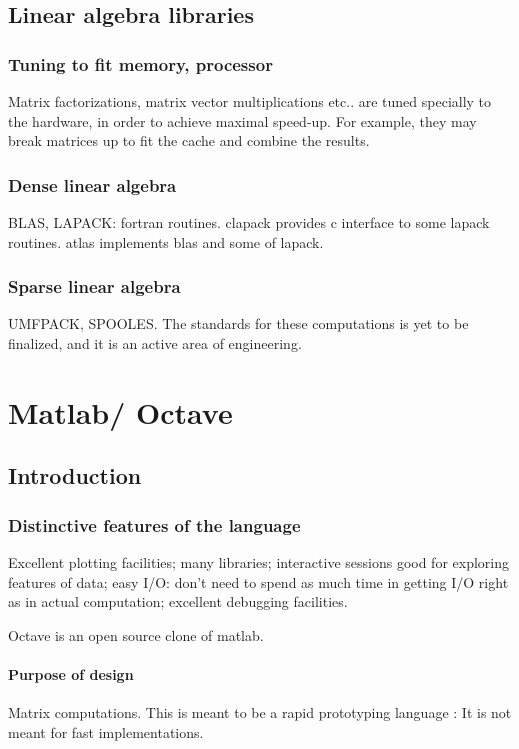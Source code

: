 \documentclass[oneside, article]{memoir}
\begin{document}
\section{Linear algebra libraries}
\subsection{Tuning to fit memory, processor}
Matrix factorizations, matrix vector multiplications etc.. are tuned specially to the hardware, in order to achieve maximal speed-up. For example, they may break matrices up to fit the cache and combine the results.

\subsection{Dense linear algebra}
BLAS, LAPACK: fortran routines. clapack provides c interface to some lapack routines. atlas implements blas and some of lapack.

\subsection{Sparse linear algebra}
UMFPACK, SPOOLES. The standards for these computations is yet to be finalized, and it is an active area of engineering.

\chapter{Matlab/ Octave}
\section{Introduction}
\subsection{Distinctive features of the language}
Excellent plotting facilities; many libraries; interactive sessions good for exploring features of data; easy I/O: don't need to spend as much time in getting I/O right as in actual computation; excellent debugging facilities.

Octave is an open source clone of matlab.

\subsubsection{Purpose of design}
Matrix computations. This is meant to be a rapid prototyping language : It is not meant for fast implementations.
\end{document}
